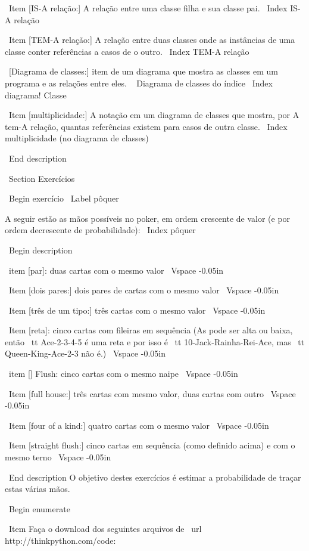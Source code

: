 \documentclass[10pt]{book}
\begin{document}
\begin {itemize}
{{{{{{{{{{{{{{{{{\ Item [IS-A relação:] A relação entre uma classe filha
e sua classe pai.
\ Index {IS-A relação}

\ Item [TEM-A relação:] A relação entre duas classes
onde as instâncias de uma classe conter referências a casos de
o outro.
\ Index {TEM-A relação}

\ [Diagrama de classes:] item de um diagrama que mostra as classes em um programa
e as relações entre eles.
\ {} Diagrama de classes do índice
\ Index {diagrama! Classe}

\ Item [multiplicidade:] A notação em um diagrama de classes que mostra, por
A tem-A relação, quantas referências existem para casos
de outra classe.
\ Index {multiplicidade (no diagrama de classes)}

\ End {description}


\ Section {Exercícios}

\ Begin {} exercício
\ Label {} pôquer

A seguir estão as mãos possíveis no poker, em ordem crescente
de valor (e por ordem decrescente de probabilidade):
\ Index {} pôquer

\ Begin {description}

\ item [par]: duas cartas com o mesmo valor
\ Vspace {-0.05in}

\ Item [dois pares:] dois pares de cartas com o mesmo valor
\ Vspace {-0.05in}

\ Item [três de um tipo:] três cartas com o mesmo valor
\ Vspace {-0.05in}

\ Item [reta]: cinco cartas com fileiras em sequência (As pode
ser alta ou baixa, então {\ tt Ace-2-3-4-5} é uma reta e por isso é {\ tt
10-Jack-Rainha-Rei-Ace}, mas {\ tt Queen-King-Ace-2-3} não é.)
\ Vspace {-0.05in}

\ item [] Flush: cinco cartas com o mesmo naipe
\ Vspace {-0.05in}

\ Item [full house:] três cartas com mesmo valor, duas cartas com outro
\ Vspace {-0.05in}

\ Item [four of a kind:] quatro cartas com o mesmo valor
\ Vspace {-0.05in}

\ Item [straight flush:] cinco cartas em sequência (como definido acima) e
com o mesmo terno
\ Vspace {-0.05in}

\ End {description}
%
O objetivo destes exercícios é estimar
a probabilidade de traçar estas várias mãos.

\ Begin {enumerate}

\ Item Faça o download dos seguintes arquivos de \ url {http://thinkpython.com/code}:

}}}}}}}}}}}}}}}}}
\end{itemize}
\end{document}
